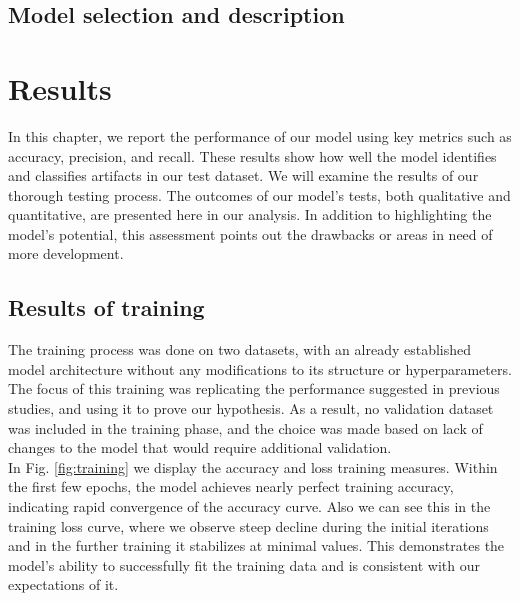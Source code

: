 \documentclass[12pt,a4paper,titlepage,openany]{report}
\begin{document}
\section{Model selection and description}


\chapter{Results}
\thispagestyle{fancy}

In this chapter, we report the performance of our model using key metrics such as accuracy, precision, and recall. These results show how well the model identifies and classifies artifacts in our test dataset.
We will examine the results of our thorough testing process. The outcomes of our model's tests, both qualitative and quantitative, are presented here in our analysis. In addition to highlighting the model's potential, this assessment points out the drawbacks or areas in need of more development.

\section{Results of training}

The training process was done on two datasets, with an already established model architecture without any modifications to its structure or hyperparameters. The focus of this training was replicating the performance suggested in previous studies, and using it to prove our hypothesis. 
As a result, no validation dataset was included in the training phase, and the choice was made based on lack of changes to the model that would require additional validation. \\

In Fig. \ref{fig:training} we display the accuracy and loss training measures. 
Within the first few epochs, the model achieves nearly perfect training accuracy, indicating rapid convergence of the accuracy curve.
Also we can see this in the training loss curve, where we observe steep decline during the initial iterations and in the further training it stabilizes at minimal values.
This demonstrates the model's ability to successfully fit the training data and is consistent with our expectations of it.
\end{document}
